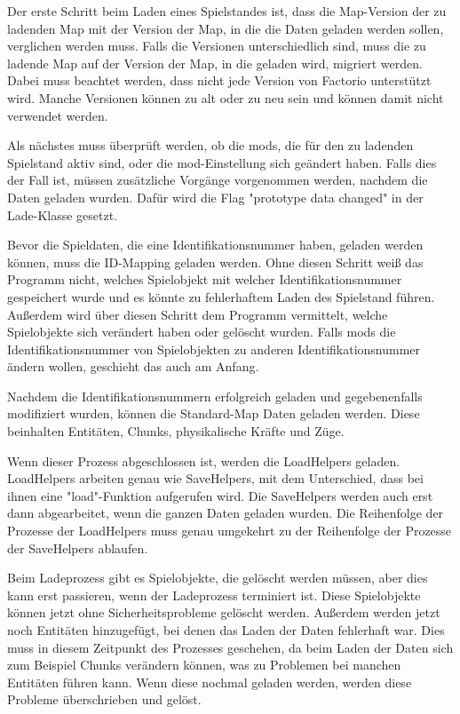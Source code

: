 Der erste Schritt beim Laden eines Spielstandes ist, dass die Map-Version der zu ladenden Map mit der Version der Map, in die die Daten geladen werden sollen, verglichen werden muss. Falls die Versionen unterschiedlich sind, muss die zu ladende Map auf der Version der Map, in die geladen wird, migriert werden. Dabei muss beachtet werden, dass nicht jede Version von Factorio unterstützt wird. Manche Versionen können zu alt oder zu neu sein und können damit nicht verwendet werden.\cite{factorioGithubSaveLoad}

Als nächstes muss überprüft werden, ob die \acp{mod}, die für den zu ladenden Spielstand aktiv sind, oder die \ac{mod}-Einstellung sich geändert haben. Falls dies der Fall ist, müssen zusätzliche Vorgänge vorgenommen werden, nachdem die Daten geladen wurden. Dafür wird die Flag "prototype data changed" in der Lade-Klasse gesetzt.\cite{factorioGithubSaveLoad}

Bevor die Spieldaten, die eine Identifikationsnummer haben, geladen werden können, muss die ID-Mapping geladen werden. Ohne diesen Schritt weiß das Programm nicht, welches Spielobjekt mit welcher Identifikationsnummer gespeichert wurde und es könnte zu fehlerhaftem Laden des Spielstand führen. Außerdem wird über diesen Schritt dem Programm vermittelt, welche Spielobjekte sich verändert haben oder gelöscht wurden. Falls \acp{mod} die Identifikationsnummer von Spielobjekten zu anderen Identifikationsnummer ändern wollen, geschieht das auch am Anfang.\cite{factorioGithubSaveLoad}

Nachdem die Identifikationsnummern erfolgreich geladen und gegebenenfalls modifiziert wurden, können die Standard-Map Daten geladen werden. Diese beinhalten Entitäten, Chunks, physikalische Kräfte und Züge.\cite{factorioGithubSaveLoad}

Wenn dieser Prozess abgeschlossen ist, werden die LoadHelpers geladen. LoadHelpers arbeiten genau wie SaveHelpers, mit dem Unterschied, dass bei ihnen eine "load"-Funktion aufgerufen wird. Die SaveHelpers werden auch erst dann abgearbeitet, wenn die ganzen Daten geladen wurden. Die Reihenfolge der Prozesse der LoadHelpers muss genau umgekehrt zu der Reihenfolge der Prozesse der SaveHelpers ablaufen.\cite{factorioGithubSaveLoad}

Beim Ladeprozess gibt es Spielobjekte, die gelöscht werden müssen, aber dies kann erst passieren, wenn der Ladeprozess terminiert ist. Diese Spielobjekte können jetzt ohne Sicherheitsprobleme gelöscht werden. Außerdem werden jetzt noch Entitäten hinzugefügt, bei denen das Laden der Daten fehlerhaft war. Dies muss in diesem Zeitpunkt des Prozesses geschehen, da beim Laden der Daten sich zum Beispiel Chunks verändern können, was zu Problemen bei manchen Entitäten führen kann. Wenn diese nochmal geladen werden, werden diese Probleme überschrieben und gelöst.\cite{factorioGithubSaveLoad}

